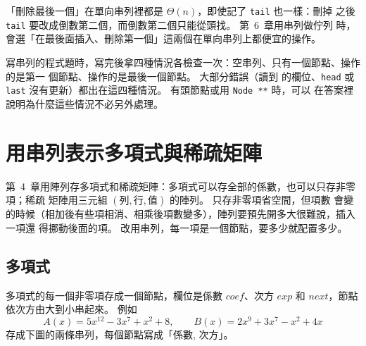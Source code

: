 「刪除最後一個」在單向串列裡都是 $\Theta(n)$，即使記了 \texttt{tail} 也一樣：刪掉
之後 \texttt{tail} 要改成倒數第二個，而倒數第二個只能從頭找。 第~6~章用串列做佇列
時，會選「在最後面插入、刪除第一個」這兩個在單向串列上都便宜的操作。

\begin{examnote}
寫串列的程式題時，寫完後拿四種情況各檢查一次：空串列、只有一個節點、操作的是第一
個節點、操作的是最後一個節點。 大部分錯誤（讀到 \NIL 的欄位、\texttt{head} 或
\texttt{last} 沒有更新）都出在這四種情況。 有頭節點或用 \texttt{Node **} 時，可以
在答案裡說明為什麼這些情況不必另外處理。
\end{examnote}

\section{用串列表示多項式與稀疏矩陣}
\label{sec:ll-poly}

第~4~章用陣列存多項式和稀疏矩陣：多項式可以存全部的係數，也可以只存非零項；稀疏
矩陣用三元組 $(\text{列}, \text{行}, \text{值})$ 的陣列。 只存非零項省空間，但項數
會變的時候（相加後有些項相消、相乘後項數變多），陣列要預先開多大很難說，插入一項還
得挪動後面的項。 改用串列，每一項是一個節點，要多少就配置多少。

\subsection{多項式}

多項式的每一個非零項存成一個節點，欄位是係數 $\mathit{coef}$、次方 $\mathit{exp}$
和 $\mathit{next}$，節點依次方由大到小串起來。 例如
\[
A(x) = 5x^{12} - 3x^{7} + x^{2} + 8, \qquad B(x) = 2x^{9} + 3x^{7} - x^{2} + 4x
\]
存成下圖的兩條串列，每個節點寫成「係數, 次方」。

\begin{center}
\label{fig:ll-poly}
\end{center}

